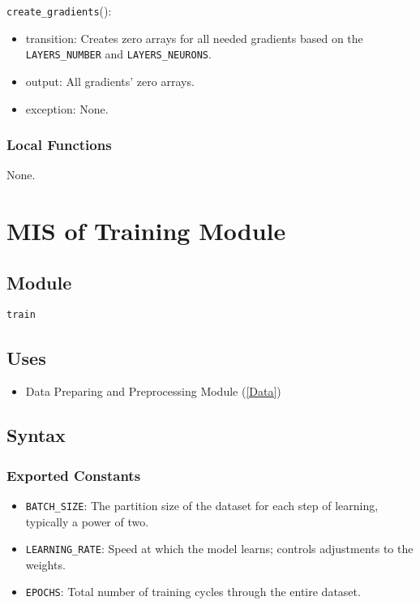 \documentclass[12pt, titlepage]{article}
\def\code#1{\texttt{#1}}
\begin{document}
\noindent \code{create\_gradients}():
\begin{itemize}
  \item transition: Creates zero arrays for all needed gradients based on the 
  \code{LAYERS\_NUMBER} and \code{LAYERS\_NEURONS}.
  \item output: All gradients' zero arrays.
  \item exception: None.
\end{itemize}

\subsubsection{Local Functions}
None.

\section{MIS of Training Module} \label{Train} 

\subsection{Module}
\code{train} 

\subsection{Uses}
\begin{itemize}
  \item Data Preparing and Preprocessing Module (\ref{Data})
\end{itemize}


\subsection{Syntax}
\subsubsection{Exported Constants}
\begin{itemize}
  \item \code{BATCH\_SIZE}: The partition size of the dataset for each step of learning, 
  typically a power of two.
  \item \code{LEARNING\_RATE}: Speed at which the model learns; controls adjustments to the weights.
  \item \code{EPOCHS}: Total number of training cycles through the entire dataset.
\end{itemize}
\end{document}

